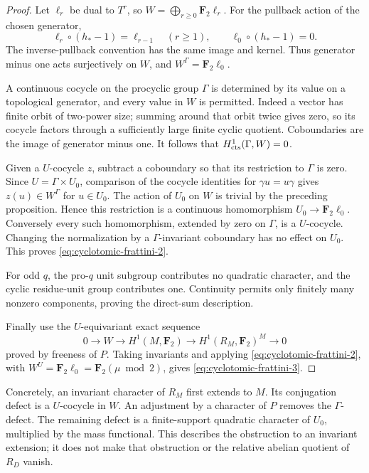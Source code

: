 \begin{proof}
Let \(\ell_r\) be dual to \(T^r\), so
\(W=\bigoplus_{r\ge0}\mathbf F_2\ell_r\).
For the pullback action of the chosen generator,
\[
 \ell_r\circ(h_*-1)=\ell_{r-1}\quad(r\ge1),\qquad
 \ell_0\circ(h_*-1)=0.
\]
The inverse-pullback convention has the same image and kernel.
Thus generator minus one acts surjectively on \(W\), and
\(W^\Gamma=\mathbf F_2\ell_0\).

A continuous cocycle on the procyclic group \(\Gamma\) is
determined by its value on a topological generator, and every
value in \(W\) is permitted.
Indeed a vector has finite orbit of two-power size; summing
around that orbit twice gives zero, so its cocycle factors
through a sufficiently large finite cyclic quotient.
Coboundaries are the image of generator minus one.
It follows that \(H^1_{\rm cts}(\Gamma,W)=0\).

Given a \(U\)-cocycle \(z\), subtract a coboundary so that its
restriction to \(\Gamma\) is zero.
Since \(U=\Gamma\times U_0\), comparison of the cocycle identities
for \(\gamma u=u\gamma\) gives \(z(u)\in W^\Gamma\) for
\(u\in U_0\).
The action of \(U_0\) on \(W\) is trivial by the preceding
proposition. Hence this restriction is a continuous
homomorphism \(U_0\to\mathbf F_2\ell_0\).
Conversely every such homomorphism, extended by zero on
\(\Gamma\), is a \(U\)-cocycle.
Changing the normalization by a \(\Gamma\)-invariant
coboundary has no effect on \(U_0\). This proves \eqref{eq:cyclotomic-frattini-2}.

For odd \(q\), the pro-\(q\) unit subgroup contributes no
quadratic character, and the cyclic residue-unit group
contributes one. Continuity permits only finitely many
nonzero components, proving the direct-sum description.

Finally use the \(U\)-equivariant exact sequence
\[
 0\longrightarrow W
 \longrightarrow H^1(M,\mathbf F_2)
 \longrightarrow H^1(R_M,\mathbf F_2)^M
 \longrightarrow0
\]
proved by freeness of \(P\).
Taking invariants and applying \eqref{eq:cyclotomic-frattini-2}, with
\(W^U=\mathbf F_2\ell_0=\mathbf F_2(\mu\bmod2)\),
gives \eqref{eq:cyclotomic-frattini-3}.
\end{proof}

\begin{remark}
Concretely, an invariant character of \(R_M\) first extends to
\(M\). Its conjugation defect is a \(U\)-cocycle in \(W\).
An adjustment by a character of \(P\) removes the
\(\Gamma\)-defect. The remaining defect is a finite-support
quadratic character of \(U_0\), multiplied by the mass
functional. This describes the obstruction to an invariant
extension; it does not make that obstruction or the relative
abelian quotient of \(R_D\) vanish.
\end{remark}
